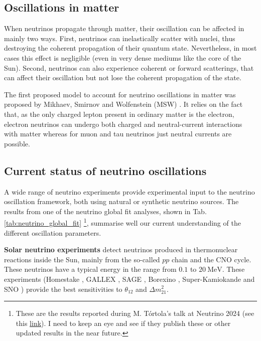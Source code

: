 \subsection{Oscillations in matter}

When neutrinos propagate through matter, their oscillation can be affected in mainly two ways. First, neutrinos can inelastically scatter with nuclei, thus destroying the coherent propagation of their quantum state. Nevertheless, in most cases this effect is negligible (even in very dense mediums like the core of the Sun). Second, neutrinos can also experience coherent or forward scatterings, that can affect their oscillation but not lose the coherent propagation of the state.

The first proposed model to account for neutrino oscillations in matter was proposed by Mikhaev, Smirnov and Wolfenstein (MSW) \cite{Wolfenstein1977}. It relies on the fact that, as the only charged lepton present in ordinary matter is the electron, electron neutrinos can undergo both charged and neutral-current interactions with matter whereas for muon and tau neutrinos just neutral currents are possible.

\subsection{Current status of neutrino oscillations}

A wide range of neutrino experiments provide experimental input to the neutrino oscillation framework, both using natural or synthetic neutrino sources. The results from one of the neutrino global fit analyses, shown in Tab. \ref{tab:neutrino_global_fit} \footnote{These are the results reported during M. T\'{o}rtola's talk at Neutrino 2024 (see this \href{https://agenda.infn.it/event/37867/contributions/233956/attachments/121839/178002/MTortola-Neutrino2024.pdf}{link}). I need to keep an eye and see if they publish these or other updated results in the near future.}, summarise well our current understanding of the different oscillation parameters.

\textbf{Solar neutrino experiments} detect neutrinos produced in thermonuclear reactions inside the Sun, mainly from the so-called $pp$ chain and the CNO cycle. These neutrinos have a typical energy in the range from $0.1$ to $20 \ \mathrm{MeV}$. These experiments (Homestake \cite{Homestake1998}, GALLEX \cite{GALLEX2010}, SAGE \cite{SAGE2009}, Borexino \cite{Borexino2011}, Super-Kamiokande \cite{Super-Kamiokande2005} and SNO \cite{SNO2011}) provide the best sensitivities to $\theta_{12}$ and $\Delta m^{2}_{21}$.


